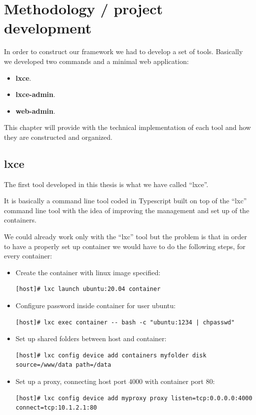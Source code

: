 \clearpage\section{Methodology / project development}

In order to construct our framework we had to develop a set of tools. Basically we developed two commands and a minimal web application:
\begin{itemize}
	\item{\textbf{lxce}.}
	\item{\textbf{lxce-admin}.}
	\item{\textbf{web-admin}.} 
\end{itemize}

This chapter will provide with the technical implementation of each tool and how they are constructed and organized. 

\subsection{lxce}
The first tool developed in this thesis is what we have called ``lxce''.

It is basically a command line tool coded in Typescript built on top of the ``lxc'' command line tool with the idea of improving the management and set up of the containers.

We could already work only with the ``lxc'' tool but the problem is that in order to have a properly set up container we would have to do the following steps, for every container:
\begin{itemize}
	\item{Create the container with linux image specified:}
		\begin{verbatim}
[host]# lxc launch ubuntu:20.04 container
		\end{verbatim}
	\item{Configure password inside container for user ubuntu:}
		\begin{verbatim}
[host]# lxc exec container -- bash -c "ubuntu:1234 | chpasswd"
		\end{verbatim}
	\item{Set up shared folders between host and container:}
		\begin{verbatim}
[host]# lxc config device add containers myfolder disk source=/www/data path=/data
		\end{verbatim}
	\item{Set up a proxy, connecting host port 4000 with container port 80:}
		\begin{verbatim}
[host]# lxc config device add myproxy proxy listen=tcp:0.0.0.0:4000 connect=tcp:10.1.2.1:80
		\end{verbatim}
\end{itemize}

